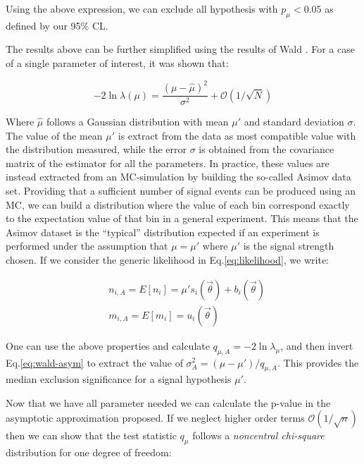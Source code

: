 Using the above expression, we can exclude all hypothesis with $p_{\mu} < 0.05$ as defined by our 95\% CL.

The results above can be further simplified using the results of Wald \cite{10.2307/1990256}. For a case of a single parameter of interest, it was shown that:

\begin{equation}
  \label{eq:wald-asym}
  - 2 \ln{\lambda(\mu)} = \frac{(\mu - \hat{\mu})^2}{\sigma^2} + \mathcal{O}(1/\sqrt{N})
\end{equation}

Where $\hat{\mu}$ follows a Gaussian distribution with mean $\mu'$ and standard deviation $\sigma$. The value of the mean $\mu'$ is extract from the data as most compatible value with the distribution measured, while the error $\sigma$ is obtained from the covariance matrix of the estimator for all the parameters. In practice, these values are instead extracted from an MC-simulation by building the so-called Asimov data set. Providing that a sufficient number of signal events can be produced using an MC, we can build a distribution where the value of each bin correspond exactly to the expectation value of that bin in a general experiment. This means that the Asimov dataset is the ``typical'' distribution expected if an experiment is performed under the assumption that $\mu = \mu'$ where $\mu'$ is the signal strength chosen. If we consider the generic likelihood in Eq.\ref{eq:likelihood}, we write:

\begin{equation}
  \label{eq:asimov-dataset-prop}
  \begin{aligned}
    &n_{i, A} = E[n_i] = \mu' s_i (\vec{\theta}) + b_i(\vec{\theta}) \\
    &m_{i, A} = E[m_i] = u_i(\vec{\theta})
  \end{aligned}    
\end{equation}

One can use the above properties and calculate $q_{\mu, A} = - 2 \ln{\lambda_{\mu}}$, and then invert Eq.\ref{eq:wald-asym} to extract the value of $\sigma^2_{A} = (\mu - \mu')/q_{\mu,A}$. This provides the median exclusion significance for a signal hypothesis $\mu'$.

Now that we have all parameter needed  we can calculate the p-value in the asymptotic approximation proposed. If we neglect higher order terms $\mathcal{O}(1/\sqrt{n})$ then we can show that the test statistic $q_{\mu}$ follows a \textit{noncentral chi-square} distribution for one degree of freedom:

